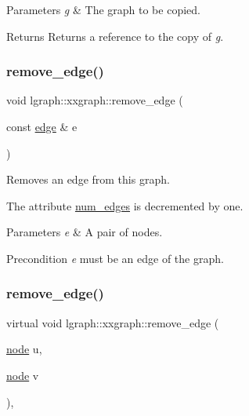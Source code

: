 \begin{DoxyParams}{Parameters}
{\em g} & The graph to be copied. \\
\hline
\end{DoxyParams}
\begin{DoxyReturn}{Returns}
Returns a reference to the copy of {\itshape g}. 
\end{DoxyReturn}
\mbox{\label{classlgraph_1_1xxgraph_a46a75fa2a10a8674ab930e9dc766e2f9}} 
\subsubsection{\texorpdfstring{remove\+\_\+edge()}{remove\_edge()}\hspace{0.1cm}{\footnotesize\ttfamily [1/2]}}
{\footnotesize\ttfamily void lgraph\+::xxgraph\+::remove\+\_\+edge (\begin{DoxyParamCaption}\item[{const \hyperlink{namespacelgraph_a76bd7d50719f03de7a85db259d80d572}{edge} \&}]{e }\end{DoxyParamCaption})\hspace{0.3cm}{\ttfamily [inherited]}}



Removes an edge from this graph. 

The attribute \hyperlink{classlgraph_1_1xxgraph_a6765a9a3be42f6e0f824635c593b35d7}{num\+\_\+edges} is decremented by one. 
\begin{DoxyParams}{Parameters}
{\em e} & A pair of nodes. \\
\hline
\end{DoxyParams}
\begin{DoxyPrecond}{Precondition}
{\itshape e} must be an edge of the graph. 
\end{DoxyPrecond}
\mbox{\label{classlgraph_1_1xxgraph_a7fd3a1309cde4f408c8d9d4cb3b898a8}} 
\subsubsection{\texorpdfstring{remove\+\_\+edge()}{remove\_edge()}\hspace{0.1cm}{\footnotesize\ttfamily [2/2]}}
{\footnotesize\ttfamily virtual void lgraph\+::xxgraph\+::remove\+\_\+edge (\begin{DoxyParamCaption}\item[{\hyperlink{namespacelgraph_a397169dd66adf725210a30fb7251773e}{node}}]{u,  }\item[{\hyperlink{namespacelgraph_a397169dd66adf725210a30fb7251773e}{node}}]{v }\end{DoxyParamCaption})\hspace{0.3cm}{\ttfamily [pure virtual]}, {\ttfamily [inherited]}}



